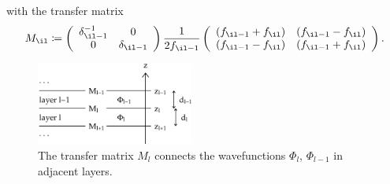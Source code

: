 with the transfer matrix
\begin{equation}\label{EMil}
  M_\il
   \coloneqq
   \left(\begin{array}{cc}
     \delta_{\il-1}^{-1}&0\\
       0 & \delta_{\il-1}
   \end{array}\right)
   \frac{1}{2f_{\il-1}}
   \left(\begin{array}{cc}
       (f_{\il-1}+f_{\il})&(f_{\il-1}-f_{\il})\\
       (f_{\il-1}-f_{\il})&(f_{\il-1}+f_{\il})
   \end{array}\right).
\end{equation}

\begin{figure}[tb]
\begin{center}
\includegraphics[width=0.46\textwidth]{fig/drawing/multilayer_boundary.ps}
\end{center}
\caption{The transfer matrix $M_l$ connects the wavefunctions
%
%
%
$\Phi_l$, $\Phi_{l-1}$ in adjacent layers.}
\label{Fboundary}
\end{figure}

